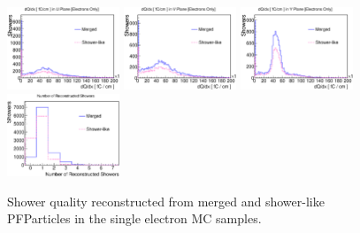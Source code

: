 \begin{figure}[htbp]
\begin{center}
\includegraphics[width=0.3\textwidth]{figs/ongoing/eminus/dQdxU.eps}
\includegraphics[width=0.3\textwidth]{figs/ongoing/eminus/dQdxV.eps}
\includegraphics[width=0.3\textwidth]{figs/ongoing/eminus/dQdxY.eps}
\includegraphics[width=0.3\textwidth]{figs/ongoing/eminus/NRecoShowers.eps}
\caption{Shower quality reconstructed from merged and shower-like PFParticles
in the single electron MC samples.}
\label{fig:shr_quality_merged_single_e}
\end{center}
\end{figure}
